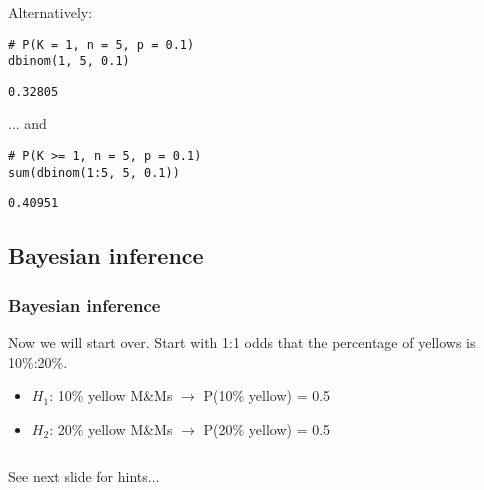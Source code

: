 \documentclass[slidestop,compress,mathserif,12pt,t,professionalfonts,xcolor=table]{beamer}
\begin{document}

\begin{frame}[fragile]
\frametitle{}

Alternatively: \\
\pause
{\footnotesize
\begin{Verbatim}[frame=single, formatcom=\color{blue}]
# P(K = 1, n = 5, p = 0.1) 
dbinom(1, 5, 0.1)
\end{Verbatim}
}
{\footnotesize
\begin{Verbatim}[frame=single, formatcom=\color{gray}]
0.32805
\end{Verbatim}
}

... and

\pause
{\footnotesize
\begin{Verbatim}[frame=single, formatcom=\color{blue}]
# P(K >= 1, n = 5, p = 0.1) 
sum(dbinom(1:5, 5, 0.1))
\end{Verbatim}
}
{\footnotesize
\begin{Verbatim}[frame=single, formatcom=\color{gray}]
0.40951
\end{Verbatim}
}


\end{frame}


\subsection{Bayesian inference}


\begin{frame}
\frametitle{Bayesian inference}

Now we will start over.  Start with 1:1 odds that the percentage of yellows is 10\%:20\%.

\begin{itemize}
\item $H_1$: 10\% yellow M\&Ms $\rightarrow$ P(10\% yellow) = 0.5
\item $H_2$: 20\% yellow M\&Ms $\rightarrow$ P(20\% yellow) = 0.5
\end{itemize}

\pause

$\:$ \\


\vfill

\begin{center}
{\footnotesize See next slide for hints...}
\end{center}

\end{frame}
\end{document}
